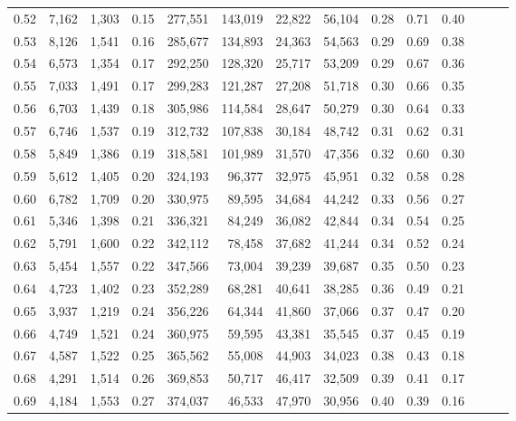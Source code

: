 \begin{tabular}{rrrrrrrrrrrrrr}
0.52 &   7,162 &  1,303 &  0.15 &  277,551 &  143,019 &  22,822 &  56,104 &  0.28 &  0.71 &      0.40 \\
0.53 &   8,126 &  1,541 &  0.16 &  285,677 &  134,893 &  24,363 &  54,563 &  0.29 &  0.69 &      0.38 \\
0.54 &   6,573 &  1,354 &  0.17 &  292,250 &  128,320 &  25,717 &  53,209 &  0.29 &  0.67 &      0.36 \\
0.55 &   7,033 &  1,491 &  0.17 &  299,283 &  121,287 &  27,208 &  51,718 &  0.30 &  0.66 &      0.35 \\
0.56 &   6,703 &  1,439 &  0.18 &  305,986 &  114,584 &  28,647 &  50,279 &  0.30 &  0.64 &      0.33 \\
0.57 &   6,746 &  1,537 &  0.19 &  312,732 &  107,838 &  30,184 &  48,742 &  0.31 &  0.62 &      0.31 \\
0.58 &   5,849 &  1,386 &  0.19 &  318,581 &  101,989 &  31,570 &  47,356 &  0.32 &  0.60 &      0.30 \\
0.59 &   5,612 &  1,405 &  0.20 &  324,193 &   96,377 &  32,975 &  45,951 &  0.32 &  0.58 &      0.28 \\
0.60 &   6,782 &  1,709 &  0.20 &  330,975 &   89,595 &  34,684 &  44,242 &  0.33 &  0.56 &      0.27 \\
0.61 &   5,346 &  1,398 &  0.21 &  336,321 &   84,249 &  36,082 &  42,844 &  0.34 &  0.54 &      0.25 \\
0.62 &   5,791 &  1,600 &  0.22 &  342,112 &   78,458 &  37,682 &  41,244 &  0.34 &  0.52 &      0.24 \\
0.63 &   5,454 &  1,557 &  0.22 &  347,566 &   73,004 &  39,239 &  39,687 &  0.35 &  0.50 &      0.23 \\
0.64 &   4,723 &  1,402 &  0.23 &  352,289 &   68,281 &  40,641 &  38,285 &  0.36 &  0.49 &      0.21 \\
0.65 &   3,937 &  1,219 &  0.24 &  356,226 &   64,344 &  41,860 &  37,066 &  0.37 &  0.47 &      0.20 \\
0.66 &   4,749 &  1,521 &  0.24 &  360,975 &   59,595 &  43,381 &  35,545 &  0.37 &  0.45 &      0.19 \\
0.67 &   4,587 &  1,522 &  0.25 &  365,562 &   55,008 &  44,903 &  34,023 &  0.38 &  0.43 &      0.18 \\
0.68 &   4,291 &  1,514 &  0.26 &  369,853 &   50,717 &  46,417 &  32,509 &  0.39 &  0.41 &      0.17 \\
0.69 &   4,184 &  1,553 &  0.27 &  374,037 &   46,533 &  47,970 &  30,956 &  0.40 &  0.39 &      0.16 \\

\end{tabular}
